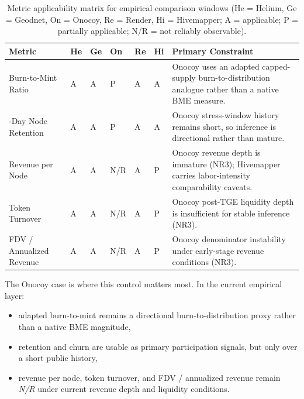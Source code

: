 \begin{table}[H]
    \centering
    \small
    \renewcommand{\arraystretch}{1.2}
    \setlength{\tabcolsep}{4pt}
    \begin{tabularx}{\textwidth}{@{}>{\raggedright\arraybackslash}p{}>{\centering\arraybackslash}p{}>{\centering\arraybackslash}p{}>{\centering\arraybackslash}p{}>{\centering\arraybackslash}p{}>{\centering\arraybackslash}p{}X@{}}
        \toprule
        \textbf{Metric} & \textbf{He} & \textbf{Ge} & \textbf{On} & \textbf{Re} & \textbf{Hi} & \textbf{Primary Constraint} \\
        \midrule
        Burn-to-Mint Ratio & A & A & P & A & A & Onocoy uses an adapted capped-supply burn-to-distribution analogue rather than a native BME measure. \\
        30-Day Node Retention & A & A & P & A & A & Onocoy stress-window history remains short, so inference is directional rather than mature. \\
        Revenue per Node & A & A & N/R & A & P & Onocoy revenue depth is immature (NR3); Hivemapper carries labor-intensity comparability caveats. \\
        Token Turnover & A & A & N/R & A & P & Onocoy post-TGE liquidity depth is insufficient for stable inference (NR3). \\
        FDV / Annualized Revenue & A & A & N/R & A & P & Onocoy denominator instability under early-stage revenue conditions (NR3). \\
        \bottomrule
    \end{tabularx}
    \caption[Metric applicability matrix]{Metric applicability matrix for empirical comparison windows (He = Helium, Ge = Geodnet, On = Onocoy, Re = Render, Hi = Hivemapper; A = applicable; P = partially applicable; N/R = not reliably observable).}
    \label{tab:metric_applicability_matrix}
\end{table}

The Onocoy case is where this control matters most. In the current empirical layer:
\begin{itemize}
    \item adapted burn-to-mint remains a directional burn-to-distribution proxy rather than a native BME magnitude,
    \item retention and churn are usable as primary participation signals, but only over a short public history,
    \item revenue per node, token turnover, and FDV / annualized revenue remain \emph{N/R} under current revenue depth and liquidity conditions.
\end{itemize}

